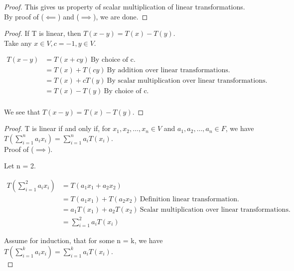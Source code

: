 \documentclass[12pt]{article}
\newenvironment{exercise}[2][Exercise]{\begin{trivlist}
\item[\hskip \labelsep{\bfseries #1}\hskip \labelsep{\bfseries #2.}]}{\end{trivlist}}
\begin{document}
\begin{exercise}{2.1.7}
\begin{proof}
        \noindent This gives us property of scalar multiplication of linear transformations. \\

        \noindent By proof of ($\impliedby$) and ($\implies$), we are done.

    \end{proof}

    \begin{proof} If T is linear, then $T(x - y) = T(x) - T(y)$. \\

        \noindent Take any $x \in V, c = -1, y \in V$.

        \begin{align*}
            T(x - y) 
            & = T(x + cy)\ \text{By choice of c.} \\
            & = T(x) + T(cy)\ \text{By addition over linear transformations.} \\
            & = T(x) + cT(y)\ \text{By scalar multiplication over linear transformations.} \\
            & = T(x) - T(y)\ \text{By choice of c.} \\
        \end{align*}
        
        \noindent We see that $T(x - y) = T(x) - T(y)$.

    \end{proof}

    \begin{proof} T is linear if and only if, for $x_1, x_2, \dots, x_n \in V$ and $a_1, a_2, \dots, a_n \in F$, we have $T(\sum_{i=1}^{n} a_i x_i) = \sum_{i=1}^{n} a_i T(x_i)$. \\

        \noindent Proof of ($\implies$).

        \noindent Let n = 2.

        \begin{align*}
            T(\sum_{i=1}^{2} a_i x_i)
            & = T(a_1 x_1 + a_2 x_2) \\
            & = T(a_1 x_1) + T(a_2 x_2)\ \text{Definition linear transformation}.\\
            & = a_1T(x_1) + a_2T(x_2)\ \text{Scalar multiplication over linear transformations}.\\
            & = \sum_{i=1}^{2} a_i T(x_i)
        \end{align*}
        
        \noindent Assume for induction, that for some n = k, we have $T(\sum_{i=1}^{k} a_i x_i) = \sum_{i=1}^{k} a_i T(x_i)$. \\


\end{proof}
\end{exercise}
\end{document}
